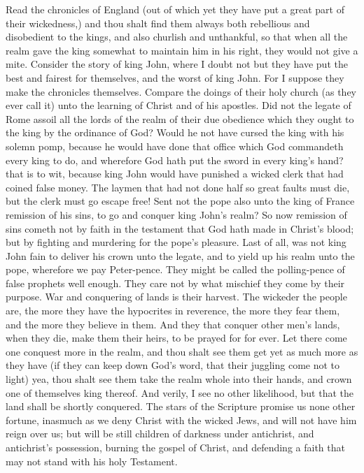 Read the chronicles of England (out of which yet they 
have put a great part of their wickedness,) and thou shalt 
find them always both rebellious and disobedient to the 
kings, and also churlish and unthankful, so that when all 
the realm gave the king somewhat to maintain him in his 
right, they would not give a mite. Consider the story 
of king John, where I doubt not but they have put the 
best and fairest for themselves, and the worst of king 
John. For I suppose they make the chronicles themselves.
Compare the doings of their holy church (as they 
ever call it) unto the learning of Christ and of his apostles. 
Did not the legate of Rome assoil all the lords of the 
realm of their due obedience which they ought to the 
king by the ordinance of God? Would he not have 
cursed the king with his solemn pomp, because he would 
have done that office which God commandeth every king 
to do, and wherefore God hath put the sword in every 
king's hand? that is to wit, because king John would 
have punished a wicked clerk that had coined false 
money. The laymen that had not done half so great 
faults must die, but the clerk must go escape free! Sent 
not the pope also unto the king of France remission of 
his sins, to go and conquer king John's realm? So now 
remission of sins cometh not by faith in the testament that 
God hath made in Christ's blood; but by fighting and 
murdering for the pope's pleasure. Last of all, was not 
king John fain to deliver his crown unto the legate, and 
to yield up his realm unto the pope, wherefore we pay 
Peter-pence. They might be called the polling-pence of 
false prophets well enough. They care not by what mischief
they come by their purpose. War and conquering 
of lands is their harvest. The wickeder the people are, 
the more they have the hypocrites in reverence, the more 
they fear them, and the more they believe in them. And 
they that conquer other men's lands, when they die, make 
them their heirs, to be prayed for for ever. Let there come
one conquest more in the realm, and thou shalt see them
get yet as much more as they have (if they can keep down
God's word, that their juggling come not to light) yea,
thou shalt see them take the realm whole into their hands,
and crown one of themselves king thereof. And verily, 
I see no other likelihood, but that the land shall be shortly 
conquered. The stars of the Scripture promise us none 
other fortune, inasmuch as we deny Christ with the wicked 
Jews, and will not have him reign over us; but will be 
still children of darkness under antichrist, and antichrist's 
possession, burning the gospel of Christ, and defending 
a faith that may not stand with his holy Testament. 

